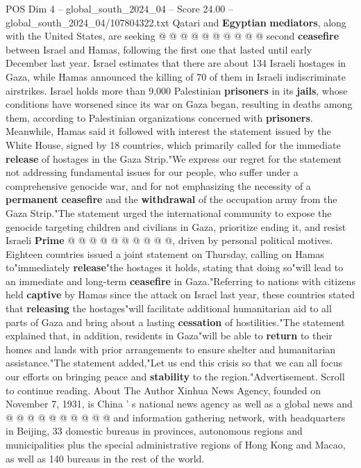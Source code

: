 \begin{textsample}{POS Dim 4 – global\_south\_2024\_04 – Score 24.00 – global\_south\_2024\_04/107804322.txt}
Qatari and \textbf{Egyptian} \textbf{mediators}, along with the United States, are seeking @ @ @ @ @ @ @ @ @ @ second \textbf{ceasefire} between Israel and Hamas, following the first one that lasted until early December last year.
Israel estimates that there are about 134 Israeli hostages in Gaza, while Hamas announced the killing of 70 of them in Israeli indiscriminate airstrikes.
Israel holds more than 9,000 Palestinian \textbf{prisoners} in its \textbf{jails}, whose conditions have worsened since its war on Gaza began, resulting in deaths among them, according to Palestinian organizations concerned with \textbf{prisoners}.
Meanwhile, Hamas said it followed with interest the statement issued by the White House, signed by 18 countries, which primarily called for the immediate \textbf{release} of hostages in the Gaza Strip."We express our regret for the statement not addressing fundamental issues for our people, who suffer under a comprehensive genocide war, and for not emphasizing the necessity of a \textbf{permanent} \textbf{ceasefire} and the \textbf{withdrawal} of the occupation army from the Gaza Strip."The statement urged the international community to expose the genocide targeting children and civilians in Gaza, prioritize ending it, and resist Israeli \textbf{Prime} @ @ @ @ @ @ @ @ @ @, driven by personal political motives.
Eighteen countries issued a joint statement on Thursday, calling on Hamas to"immediately \textbf{release}"the hostages it holds, stating that doing so"will lead to an immediate and long-term \textbf{ceasefire} in Gaza."Referring to nations with citizens held \textbf{captive} by Hamas since the attack on Israel last year, these countries stated that \textbf{releasing} the hostages"will facilitate additional humanitarian aid to all parts of Gaza and bring about a lasting \textbf{cessation} of hostilities."The statement explained that, in addition, residents in Gaza"will be able to \textbf{return} to their homes and lands with prior arrangements to ensure shelter and humanitarian assistance."The statement added,"Let us end this crisis so that we can all focus our efforts on bringing peace and \textbf{stability} to the region."Advertisement.
Scroll to continue reading.
About The Author Xinhua News Agency, founded on November 7, 1931, is China ' s national news agency as well as a global news and @ @ @ @ @ @ @ @ @ @ and information gathering network, with headquarters in Beijing, 33 domestic bureaus in provinces, autonomous regions and municipalities plus the special administrative regions of Hong Kong and Macao, as well as 140 bureaus in the rest of the world.

\end{textsample}
